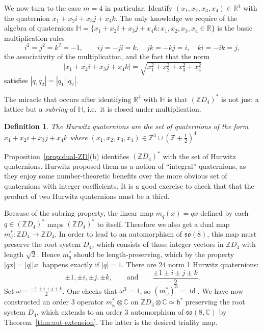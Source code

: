 \documentclass[reqno]{amsart}
\newtheorem{definition}[theorem]{Definition}
\theoremstyle{definition} \newtheorem{example}[theorem]{Example}
\newcommand{\CC}{\mathbb{C}}
\newcommand{\HH}{\mathbb{H}}
\newcommand{\RR}{\mathbb{R}}
\newcommand{\ZZ}{\mathbb{Z}}
\newcommand{\so}{\mathfrak{so}}
\DeclareMathOperator{\id}{id}
\newcommand{\h}{\mathfrak{h}}
\begin{document}
We now turn to the case $m = 4$ in particular. Identify $(x_1,x_2,x_3,x_4) \in \RR^4$ with the quaternion $x_1 + x_2 i + x_3 j + x_4 k$. The only knowledge we require of the algebra of quaternions $\HH = \{x_1 + x_2 i + x_3 j + x_4 k : x_1,x_2,x_3,x_4 \in \RR\}$ is the basic multiplication rules 
\begin{equation*}
i^2 = j^2 = k^2 = -1, \qquad ij = -ji = k,\quad jk = -kj = i,\quad ki = -ik = j,
\end{equation*}
the associativity of the multiplication, and the fact that the norm
\begin{equation*}
|x_1+x_2 i+x_3 j + x_4 k| = \sqrt{x_1^2+x_2^2+x_3^2+x_4^2}
\end{equation*}
satisfies $|q_1 q_2| = |q_1||q_2|$.

The miracle that occurs after identifying $\RR^4$ with $\HH$ is that $(\ZZ D_4)^*$ is not just a lattice but a \emph{subring} of $\HH$, i.e.\ it is closed under multiplication.
\begin{definition}
The \emph{Hurwitz quaternions} are the set of quaternions of the form $x_1 + x_2 i + x_3 j + x_4 k$ where $(x_1,x_2,x_3,x_4) \in \ZZ^4 \cup (\ZZ+\tfrac{1}{2})^4$.
\end{definition}
Proposition~\ref{prop:dual-ZD}(b) identifies $(\ZZ D_4)^*$ with the set of Hurwitz quaternions. Hurwitz proposed them as a notion of ``integral'' quaternions, as they enjoy some number-theoretic benefits over the more obvious set of quaternions with integer coefficients. It is a good exercise to check that that the product of two Hurwitz quaternions must be a third.

Because of the subring property, the linear map $m_q(x) = qx$ defined by each $q \in (\ZZ D_4)^*$ maps $(\ZZ D_4)^*$ to itself. Therefore we also get a dual map $m_q^* : \ZZ D_4 \to \ZZ D_4$. In order to lead to an automorphism of $\so(8)$, this map must preserve the root system $D_4$, which consists of those integer vectors in $\ZZ D_4$ with length $\sqrt{2}$. Hence $m_q^*$ should be length-preserving, which by the property $|qx| = |q||x|$ happens exactly if $|q| = 1$. There are $24$ norm 1 Hurwitz quaternions:
\begin{equation*}
\pm 1, \pm i, \pm j, \pm k, \qquad \text{and} \qquad \frac{\pm 1 \pm i \pm j \pm k}{2}.
\end{equation*}
Set $\omega = \tfrac{-1+i+j+k}{2}$. One checks that $\omega^3 = 1$, so $(m_{\omega}^*)^3 = \id$. We have now constructed an order 3 operator $m_{\omega}^* \otimes \CC$ on $\ZZ D_4 \otimes \CC \simeq \h^*$ preserving the root system $D_4$, which extends to an order 3 automorphism of $\so(8,\CC)$ by Theorem~\ref{thm:aut-extension}. The latter is the desired triality map.
\end{document}
